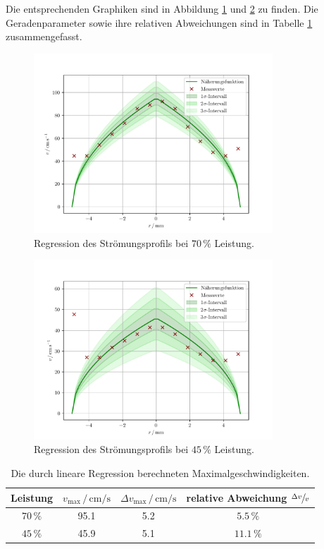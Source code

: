 Die entsprechenden Graphiken sind in Abbildung \ref{fig:str70} und \ref{fig:str45} zu finden. 
Die Geradenparameter sowie ihre relativen Abweichungen sind in Tabelle \ref{tab:Regr} zusammengefasst. 
\begin{figure}
    \centering
    \includegraphics[width=0.8\textwidth]{plots/70regr.pdf}
    \caption{Regression des Strömungsprofils bei $70\,\%$ Leistung.}
    \label{fig:str70}
\end{figure}
\begin{figure}
    \centering
    \includegraphics[width=0.8\textwidth]{plots/45regr.pdf}
    \caption{Regression des Strömungsprofils bei $45\,\%$ Leistung.}
    \label{fig:str45}
\end{figure}
\begin{table}
    \centering
    \caption{Die durch lineare Regression berechneten Maximalgeschwindigkeiten.}
    \label{tab:Regr}
    \begin{tabular}{c c c c}
        \toprule
        Leistung & $v_\text{max}\,/\,\si{\centi\meter\per\second}$ & $\Delta v_\text{max}\,/\,\si{\centi\meter\per\second}$ & relative Abweichung $\sfrac{\Delta v}{v}$ \\
        \midrule
        $70\,\%$ & 95.1 & 5.2 & $5.5\,\%$ \\
        $45\,\%$ & 45.9 & 5.1 & $11.1\,\%$ \\
        \toprule
    \end{tabular}
\end{table}